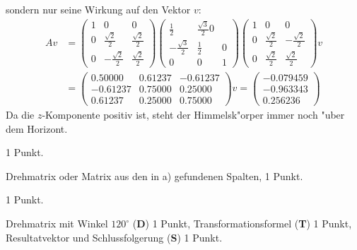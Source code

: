 \begin{loesung}
\begin{teilaufgaben}
sondern nur seine Wirkung auf den Vektor $v$:
\begin{align*}
Av&=
\begin{pmatrix}
1& 0                  & 0                 \\
0& \frac{\sqrt{2}}2   & \frac{\sqrt{2}}2  \\
0&-\frac{\sqrt{2}}2   & \frac{\sqrt{2}}2
\end{pmatrix}
\begin{pmatrix}
 \frac12          & \frac{\sqrt{3}}2 0\\
-\frac{\sqrt{3}}2 & \frac12        & 0\\
 0                & 0              & 1
\end{pmatrix}
\begin{pmatrix}
1& 0                 & 0                 \\
0& \frac{\sqrt{2}}2  &-\frac{\sqrt{2}}2  \\
0& \frac{\sqrt{2}}2  & \frac{\sqrt{2}}2  
\end{pmatrix}v
\\
&=
\begin{pmatrix}
   0.50000 & 0.61237& -0.61237\\
  -0.61237 & 0.75000&  0.25000\\
   0.61237 & 0.25000&  0.75000
\end{pmatrix}v
=\begin{pmatrix}
  -0.079459\\
  -0.963343\\
   0.256236
\end{pmatrix}
\end{align*}
Da die $z$-Komponente positiv ist, steht der Himmelsk"orper immer noch
"uber dem Horizont.
\qedhere
\end{teilaufgaben}
\end{loesung}

\begin{bewertung}
\begin{teilaufgaben}
\item 1 Punkt.
\item Drehmatrix oder Matrix aus den in a) gefundenen Spalten, 1 Punkt.
\item 1 Punkt.
\item Drehmatrix mit Winkel $120^\circ$ ({\bf D}) 1 Punkt,
Transformationsformel ({\bf T}) 1 Punkt,
Resultatvektor und Schlussfolgerung ({\bf S}) 1 Punkt.
\end{teilaufgaben}
\end{bewertung}

